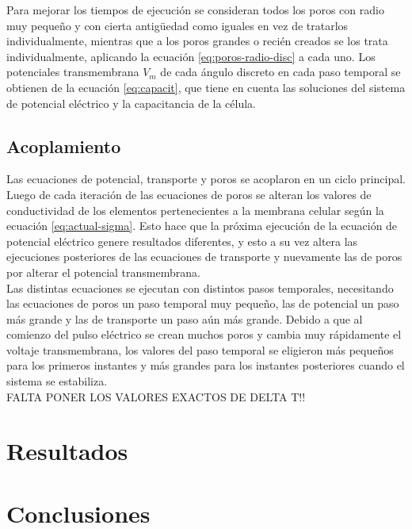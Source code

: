 \documentclass[a4paper,10pt]{article}
\begin{document}
Para mejorar los tiempos de ejecución se consideran todos los poros con radio muy pequeño y con cierta antigüedad como iguales en vez de tratarlos individualmente, mientras que a los poros grandes o recién creados se los trata individualmente, aplicando la ecuación \ref{eq:poros-radio-disc} a cada uno. Los potenciales transmembrana $V_m$ de cada ángulo discreto en cada paso temporal se obtienen de la ecuación \ref{eq:capacit}, que tiene en cuenta las soluciones del sistema de potencial eléctrico y la capacitancia de la célula.\\

\subsection{Acoplamiento}
Las ecuaciones de potencial, transporte y poros se acoplaron en un ciclo principal. Luego de cada iteración de las ecuaciones de poros se alteran los valores de conductividad de los elementos pertenecientes a la membrana celular según la ecuación \ref{eq:actual-sigma}. Esto hace que la próxima ejecución de la ecuación de potencial eléctrico genere resultados diferentes, y esto a su vez altera las ejecuciones posteriores de las ecuaciones de transporte y nuevamente las de poros por alterar el potencial transmembrana.\\

Las distintas ecuaciones se ejecutan con distintos pasos temporales, necesitando las ecuaciones de poros un paso temporal muy pequeño, las de potencial un paso más grande y las de transporte un paso aún más grande. Debido a que al comienzo del pulso eléctrico se crean muchos poros y cambia muy rápidamente el voltaje transmembrana, los valores del paso temporal se eligieron más pequeños para los primeros instantes y más grandes para los instantes posteriores cuando el sistema se estabiliza.\\

FALTA PONER LOS VALORES EXACTOS DE DELTA T!!

\section{Resultados}

\section{Conclusiones}
\end{document}
